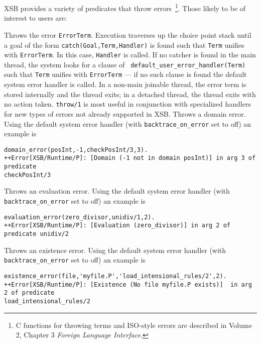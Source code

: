 XSB provides a variety of predicates that throw errors~\footnote{C
  functions for throwing terms and ISO-style errors are described in
  Volume 2, Chapter 3 {\em Foreign Language Interface}.}. Those likely
to be of interest to users are:
\begin{description}
%
Throws the error {\tt ErrorTerm}.  Execution traverses up the choice
point stack until a goal of the form {\tt catch(Goal,Term,Handler)} is
found such that {\tt Term} unifies with {\tt ErrorTerm}.  In this
case, {\tt Handler} is called.  If no catcher is found in the main
thread, the system looks for a clause of {\tt
  default\_user\_error\_handler(Term)} such that {\tt Term} unifies
with {\tt ErrorTerm} --- if no such clause is found the default system
error handler is called.  In a non-main joinable thread, the error
term is stored internally and the thread exits; in a detached thread,
the thread exits with no action taken.  {\tt throw/1} is most useful
in conjunction with specialized handlers for new types of errors not
already supported in XSB.
%
%
Throws a domain error.  Using the default system error handler (with
{\tt backtrace\_on\_error} set to off) an example is {\small
\begin{verbatim}
domain_error(posInt,-1,checkPosInt/3,3).
++Error[XSB/Runtime/P]: [Domain (-1 not in domain posInt)] in arg 3 of predicate 
checkPosInt/3
\end{verbatim} }
%
%
Throws an evaluation error.  Using the default system error handler
(with {\tt backtrace\_on\_error} set to off) an example is {\small
\begin{verbatim}
evaluation_error(zero_divisor,unidiv/1,2).
++Error[XSB/Runtime/P]: [Evaluation (zero_divisor)] in arg 2 of predicate unidiv/2
\end{verbatim} }
%
%
Throws an existence error.  Using the default system error
handler (with {\tt backtrace\_on\_error} set to off) an example is 
{\small 
\begin{verbatim}
existence_error(file,'myfile.P','load_intensional_rules/2',2).
++Error[XSB/Runtime/P]: [Existence (No file myfile.P exists)]  in arg 2 of predicate 
load_intensional_rules/2
\end{verbatim}
}
%

\end{description}
